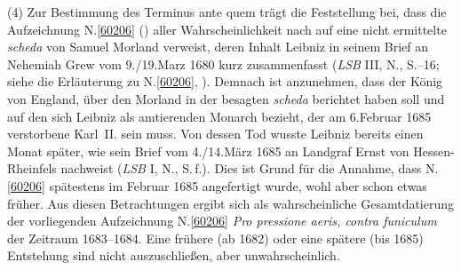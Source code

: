 \pend%
\pstart%
(4)
Zur Bestimmung des Terminus ante quem trägt die Feststellung bei, dass die Aufzeichnung N.\;\ref{60206} () aller Wahrscheinlichkeit nach auf eine nicht ermittelte \textit{scheda} von Samuel Morland verweist, deren Inhalt Leibniz in seinem Brief an Nehemiah Grew vom 9./19.\;Marz 1680 kurz zusammenfasst (\textit{LSB} III, N., S.--16; siehe die Erläuterung zu N.\;\ref{60206}, ).\cite{02600}
Demnach ist anzunehmen, dass der König von England, über den Morland in der besagten \textit{scheda} berichtet haben soll und auf den sich Leibniz als amtierenden Monarch bezieht, der am 6.\;Februar 1685 verstorbene Karl~II. sein muss.
Von dessen Tod wusste Leibniz bereits einen Monat später, wie sein Brief vom 4./14.\;März 1685 an Landgraf Ernst von Hessen-Rheinfels nachweist (\textit{LSB} I, N., S.\,f.).\cite{02601}
Dies ist Grund für die Annahme, dass N.\;\ref{60206} spätestens im Februar 1685 angefertigt wurde, wohl aber schon etwas früher.
\pend%
\pstart%
Aus diesen Betrachtungen ergibt sich als wahrscheinliche Gesamtdatierung der vorliegenden Aufzeichnung N.\;\ref{60206} \textit{Pro pressione aeris, contra funiculum} der Zeitraum 1683--1684.
Eine frühere (ab 1682) oder eine spätere (bis 1685) Entstehung sind nicht auszuschließen, aber unwahrscheinlich.
\pend%
%
\frenchspacing%
\newpage%
